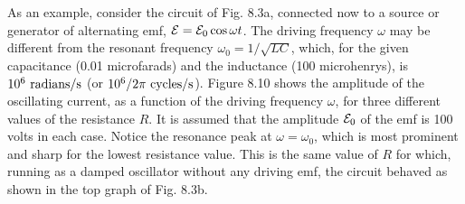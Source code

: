 As an example, consider the circuit of Fig. 8.3a, connected now
to a source or generator of alternating emf, $\mathcal{E} = \mathcal{E}_0 \cos \omega t$. The driving
frequency $\omega$ may be different from the resonant frequency
$\omega_0 = 1/\sqrt{LC}$, which, for the given capacitance (0.01 microfarads)
and the inductance (100 microhenrys), is $10^6\ \text{radians}/\sunit$
(or $10^6/2\pi\ \text{cycles}/\sunit$).
Figure 8.10 shows the amplitude of the oscillating 
current, as a function of the driving frequency $\omega$, for three different
values of the resistance $R$. It is assumed that the amplitude $\mathcal{E}_0$
of the emf is 100 volts in each case. Notice the resonance peak at
$\omega = \omega_0$, which is most prominent and sharp for the lowest resistance
value. This is the same value of $R$ for which, running as a damped
oscillator without any driving emf, the circuit behaved as shown in
the top graph of Fig. 8.3b.

